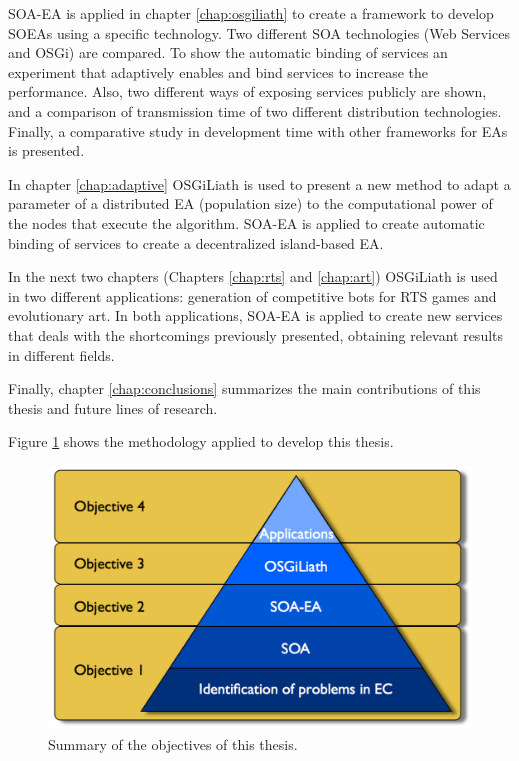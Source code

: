 SOA-EA is applied in chapter \ref{chap:osgiliath} to create a framework to develop SOEAs using a specific technology. Two different SOA technologies (Web Services and OSGi) are compared. To show the automatic binding of services an experiment that adaptively enables and bind services to increase the performance. Also, two different ways of exposing services publicly are shown, and a comparison of transmission time of two different distribution technologies. Finally, a comparative study in development time with other frameworks for EAs is presented.

In chapter \ref{chap:adaptive} OSGiLiath is used to present a new method to adapt a parameter of a distributed EA (population size) to the computational power of the nodes that execute the algorithm. SOA-EA is applied to create automatic binding of services to create a decentralized island-based EA.

In the next two chapters (Chapters \ref{chap:rts} and \ref{chap:art}) OSGiLiath is used in two different applications: generation of competitive bots for RTS games and evolutionary art. In both applications, SOA-EA is applied to create new services that deals with the shortcomings previously presented, obtaining relevant results in different fields.

Finally, chapter \ref{chap:conclusions} summarizes the main contributions of this thesis and future lines of research.

Figure \ref{fig:intro:piramid} shows the methodology applied to develop this thesis.

\begin{figure}
\centering
 \includegraphics[scale =0.3] {gfx/intro/tesispiramide.pdf}
\caption{Summary of the objectives of this thesis.}
\label{fig:intro:piramid}
\end{figure}

